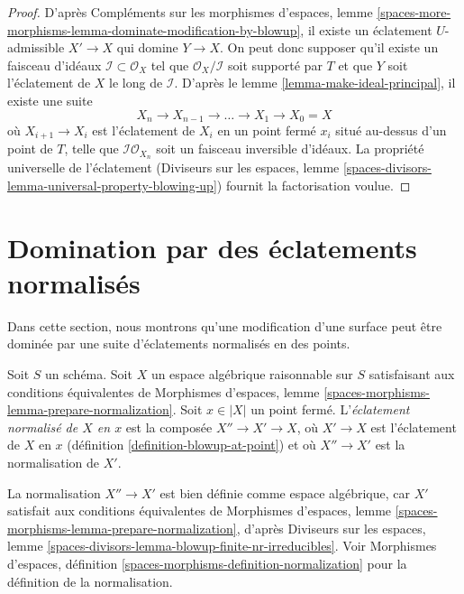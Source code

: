 \begin{proof}
D'après Compléments sur les morphismes d'espaces, lemme
\ref{spaces-more-morphisms-lemma-dominate-modification-by-blowup},
il existe un éclatement $U$-admissible $X' \to X$ qui domine $Y \to X$.
On peut donc supposer qu'il existe un faisceau d'idéaux
$\mathcal{I} \subset \mathcal{O}_X$ tel que
$\mathcal{O}_X/\mathcal{I}$ soit supporté par $T$ et que $Y$ soit
l'éclatement de $X$ le long de $\mathcal{I}$.
D'après le lemme \ref{lemma-make-ideal-principal}, il existe une suite
$$
X_n \to X_{n - 1} \to \ldots \to X_1 \to X_0 = X
$$
où $X_{i + 1} \to X_i$ est l'éclatement de $X_i$ en un point fermé $x_i$
situé au-dessus d'un point de $T$, telle que
$\mathcal{I}\mathcal{O}_{X_n}$ soit un faisceau inversible d'idéaux.
La propriété universelle de l'éclatement
(Diviseurs sur les espaces, lemme
\ref{spaces-divisors-lemma-universal-property-blowing-up})
fournit la factorisation voulue.
\end{proof}





\section{Domination par des éclatements normalisés}
\label{section-normalized-blowups}

\noindent
Dans cette section, nous montrons qu'une modification d'une surface peut être
dominée par une suite d'éclatements normalisés en des points.

\begin{definition}
\label{definition-normalized-blowup}
Soit $S$ un schéma. Soit $X$ un espace algébrique raisonnable sur $S$
satisfaisant aux conditions équivalentes de Morphismes d'espaces, lemme
\ref{spaces-morphisms-lemma-prepare-normalization}.
Soit $x \in |X|$ un point fermé. L'{\it éclatement normalisé de $X$ en $x$}
est la composée $X'' \to X' \to X$, où $X' \to X$ est l'éclatement de $X$
en $x$ (définition \ref{definition-blowup-at-point}) et où
$X'' \to X'$ est la normalisation de $X'$.
\end{definition}

\noindent
La normalisation $X'' \to X'$ est bien définie comme espace algébrique,
car $X'$ satisfait aux conditions équivalentes de
Morphismes d'espaces, lemme
\ref{spaces-morphisms-lemma-prepare-normalization}, d'après
Diviseurs sur les espaces, lemme
\ref{spaces-divisors-lemma-blowup-finite-nr-irreducibles}.
Voir Morphismes d'espaces, définition
\ref{spaces-morphisms-definition-normalization}
pour la définition de la normalisation.

